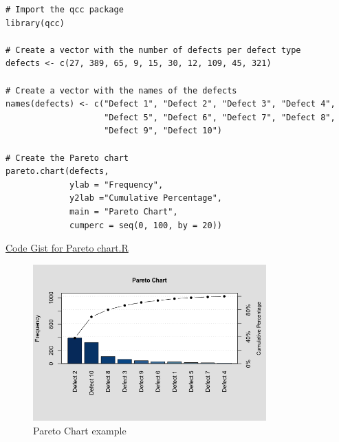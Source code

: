 \begin{lstlisting}
# Import the qcc package
library(qcc)                  

# Create a vector with the number of defects per defect type
defects <- c(27, 389, 65, 9, 15, 30, 12, 109, 45, 321)            

# Create a vector with the names of the defects 
names(defects) <- c("Defect 1", "Defect 2", "Defect 3", "Defect 4",
                    "Defect 5", "Defect 6", "Defect 7", "Defect 8",
                    "Defect 9", "Defect 10")   

# Create the Pareto chart
pareto.chart(defects,
             ylab = "Frequency",
             y2lab ="Cumulative Percentage",
             main = "Pareto Chart",
             cumperc = seq(0, 100, by = 20))
\end{lstlisting}
\href{https://gist.githubusercontent.com/rsalaza4/a69615daba7c7c56290838b46cc121cc/raw/974774009f38d6af534168f2a324ce2b3c61d632/Pareto\%20chart.R}{Code Gist for Pareto chart.R}
\begin{figure}[ht]
    \centering
    \includegraphics[width=0.8\textwidth]{images/Pareto_chart_example.png}
    \caption{Pareto Chart example}
    \label{fig:pareto_chart_example}
\end{figure}

